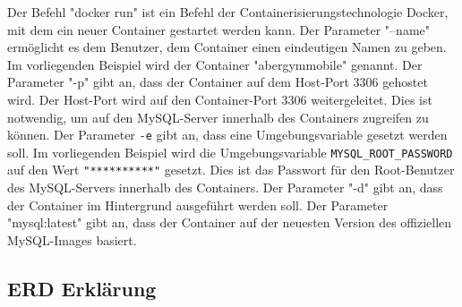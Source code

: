 Der Befehl "docker run" ist ein Befehl der Containerisierungstechnologie Docker, mit dem ein neuer Container gestartet werden kann. Der Parameter "--name" ermöglicht es dem Benutzer, dem Container einen eindeutigen Namen zu geben. Im vorliegenden Beispiel wird der Container "abergymmobile" genannt.
\newline
\newline
Der Parameter "-p" gibt an, dass der Container auf dem Host-Port 3306 gehostet wird. Der Host-Port wird auf den Container-Port 3306 weitergeleitet. Dies ist notwendig, um auf den MySQL-Server innerhalb des Containers zugreifen zu können.
\newline
\newline
Der Parameter \verb|-e| gibt an, dass eine Umgebungsvariable gesetzt werden soll. Im vorliegenden Beispiel wird die Umgebungsvariable \verb|MYSQL_ROOT_PASSWORD| auf den Wert \verb|"**********"| gesetzt. Dies ist das Passwort für den Root-Benutzer des MySQL-Servers innerhalb des Containers.
\newline
\newline
Der Parameter "-d" gibt an, dass der Container im Hintergrund ausgeführt werden soll. Der Parameter "mysql:latest" gibt an, dass der Container auf der neuesten Version des offiziellen MySQL-Images basiert.
\newpage
\subsection{ERD Erklärung}

